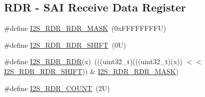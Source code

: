 \subsection*{R\+DR -\/ S\+AI Receive Data Register}
\begin{DoxyCompactItemize}
\item 
\#define \mbox{\hyperlink{group___i2_s___register___masks_gaccf614975eae2e2df22dafe25a0f15e5}{I2\+S\+\_\+\+R\+D\+R\+\_\+\+R\+D\+R\+\_\+\+M\+A\+SK}}~(0x\+F\+F\+F\+F\+F\+F\+F\+F\+U)
\item 
\#define \mbox{\hyperlink{group___i2_s___register___masks_ga044f3938825909104af369aa0c62f2f5}{I2\+S\+\_\+\+R\+D\+R\+\_\+\+R\+D\+R\+\_\+\+S\+H\+I\+FT}}~(0\+U)
\item 
\#define \mbox{\hyperlink{group___i2_s___register___masks_ga116e8038e227181784edc27efd68458d}{I2\+S\+\_\+\+R\+D\+R\+\_\+\+R\+DR}}(x)~(((uint32\+\_\+t)(((uint32\+\_\+t)(x)) $<$$<$ \mbox{\hyperlink{group___i2_s___register___masks_ga044f3938825909104af369aa0c62f2f5}{I2\+S\+\_\+\+R\+D\+R\+\_\+\+R\+D\+R\+\_\+\+S\+H\+I\+FT}})) \& \mbox{\hyperlink{group___i2_s___register___masks_gaccf614975eae2e2df22dafe25a0f15e5}{I2\+S\+\_\+\+R\+D\+R\+\_\+\+R\+D\+R\+\_\+\+M\+A\+SK}})
\item 
\#define \mbox{\hyperlink{group___i2_s___register___masks_ga2daa64d898edf97a42ab82ccf4500b74}{I2\+S\+\_\+\+R\+D\+R\+\_\+\+C\+O\+U\+NT}}~(2\+U)
\end{DoxyCompactItemize}
